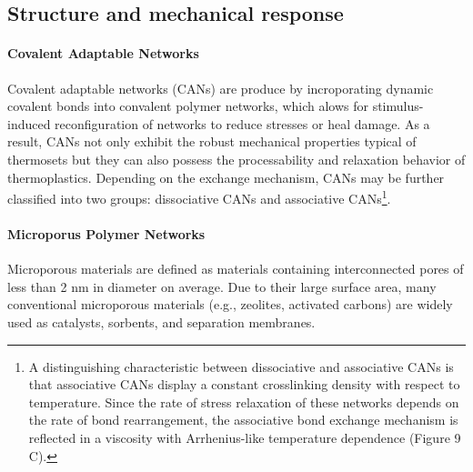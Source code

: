 \subsection{Structure and mechanical response}




\paragraph{Covalent Adaptable Networks} Covalent adaptable networks (CANs) are produce by incroporating dynamic covalent bonds into convalent polymer networks, which alows for stimulus-induced reconfiguration of networks to reduce stresses or heal damage.
As a result, CANs not only exhibit the robust mechanical properties typical of thermosets but they can also possess the processability and relaxation behavior of thermoplastics.
Depending on the exchange mechanism, CANs may be further classified into two groups: dissociative CANs and associative CANs\citep{guPolymerNetworksPlastics2020}\footnote{A distinguishing characteristic between dissociative and associative CANs is that associative CANs display a constant crosslinking density with respect to temperature.
Since the rate of stress relaxation of these networks depends on the rate of bond rearrangement, the associative bond exchange mechanism is reflected in a viscosity with Arrhenius-like temperature dependence (Figure 9 C).
}.

\paragraph{Microporus Polymer Networks} Microporous materials are defined as materials containing interconnected pores of less than 2 nm in diameter on average. 
Due to their large surface area, many conventional microporous materials (e.g., zeolites, activated carbons) are widely used as catalysts, sorbents, and separation membranes. 

